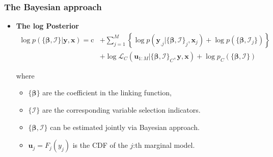 \documentclass[10pt,aspectratio=169]{beamer}
\begin{document}
\begin{frame}%
  \frametitle{The Bayesian approach}
  \begin{itemize}

  \item \textbf{The log Posterior}
    \[
    \begin{split}\log p(\{\bm{\beta},\bm{\mathcal{I}}\}|\bm{y},\bm{x})=
      \mathrm{c}&+\sum\nolimits _{j=1}^{M}\left\{\log
        p(\bm{y}_{.j}|\{\bm{\beta},\bm{\mathcal{I}}\}_{j},\bm{x}_{j}) + \log p(\{\bm{\beta},\bm{\mathcal{I}}_j\}) \right\}\\
      & +\log\mathcal{L}_{C}(\bm{u}_{1:M}|\{\bm{\beta},\bm{\mathcal{I}}\}_{C},\bm{y},\bm{x})+
      \log p_C(\{\bm{\beta},\bm{\mathcal{I}}\})
    \end{split}
    \]

    where
    \begin{itemize}
    \item $\{\bm{\beta}\}$ are the coefficient in the linking function,
    \item $\{\bm{\mathcal{I}}\}$ are the corresponding variable selection indicators.
    \item $\{\bm{\beta},\bm{\mathcal{I}}\}$ can be estimated jointly via Bayesian approach.
    \item $\bm{u}_{j}=F_{j}(y_{j})$ is the CDF of the $j$:th marginal model.
    \end{itemize}


  \end{itemize}
\end{frame}
\end{document}
